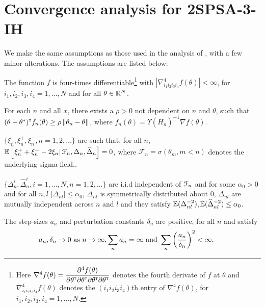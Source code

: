 \section{Convergence analysis for 2SPSA-3-IH}
\label{sec:2spsa-results}
We make the same assumptions as those used in the analysis of \cite{prashanth2015rdsa}, with a few minor alterations. The assumptions are listed below:
\begin{pvn}
\item  The function
$f$ is four-times differentiable\footnote{Here $\nabla^4 f(\theta) = \dfrac{\partial^4 f (\theta)}{\partial \theta^\mathsf{\scriptscriptstyle T} \partial \theta^\mathsf{\scriptscriptstyle T} \partial \theta^\mathsf{\scriptscriptstyle T} \partial \theta^\mathsf{\scriptscriptstyle T}}$ denotes the fourth derivate of $f$ at $\theta$ and $\nabla^4_{i_1 i_2 i_3 i_4} f(\theta)$ denotes the $(i_1 i_2 i_3 i_4)$th entry of $\nabla^4 f(\theta)$, for $i_1, i_2, i_3,i_4=1,\ldots, N$.} with $\left|\nabla^4_{i_1 i_2 i_3 i_4} f(\theta) \right| < \infty$, for $i_1, i_2, i_3,i_4=1,\ldots, N$ and for all $\theta\in \mathbb{R}^N$. 


\item For each $n$ and all $x$, there exists a $\rho>0$ not dependent on $n$ and $\theta$, such that $(\theta-\theta^*)^\mathsf{\scriptscriptstyle T} \bar f_n(\theta) \ge \rho \left\| \theta_n - \theta\right\|$, where $\bar f_n(\theta) = \Upsilon(\overline H_n)^{-1} \nabla f(\theta)$.

\item $\{\xi_n, \xi_n^+,\xi_n^-, n=1,2,\ldots\}$ are such that, for all $n$, $\mathbb{E}\left[\left. \xi_n^+ + \xi_n^- - 2 \xi_n \right| \mathcal{F}_n, \Delta_n, \widehat \Delta_n \right] = 0$, where $\mathcal{F}_n = \sigma(\theta_m,m < n)$ denotes the underlying sigma-field.. 

\item $\{\Delta_n^i,\widehat\Delta_n^i, i=1,\ldots,N, n=1,2,\ldots\}$ are i.i.d independent of $\mathcal{F}_n$ and for some $\alpha_0 > 0$ and for all $n,l$ $|\Delta_{nl}|\le \alpha_0$, $\Delta_{nl}$ is symmetrically distributed about 0, $\Delta_{nl}$ are mutually independent across $n$ and $l$ and they satisfy $\mathbb{E} (\Delta_{nl}^{-2})$,$\mathbb{E} (\widehat\Delta_{nl}^{-2}) \le \alpha_0$.

\item  The step-sizes $a_n$ and perturbation constants $\delta_n$ are positive, for all $n$ and satisfy
$$\hspace{-1.7em} a_n, \delta_n \rightarrow 0\text{ as } n \rightarrow \infty, 
\sum_n a_n=\infty \text{ and } \sum_n \left(\frac{a_n}{\delta_n}\right)^2 <\infty.$$


\end{pvn}
